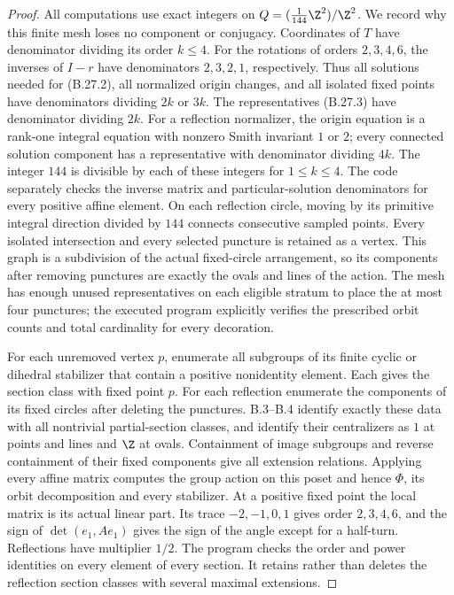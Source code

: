 \begin{proof}
All computations use exact integers on
$Q=(\frac1{144}\Z^2)/\Z^2$.  We record why this finite mesh loses no
component or conjugacy.  Coordinates of $T$ have denominator dividing
its order $k\le4$.  For the rotations of orders $2,3,4,6$, the inverses
of $I-r$ have denominators $2,3,2,1$, respectively.  Thus all solutions
needed for (B.27.2), all normalized origin changes, and all isolated
fixed points have denominators dividing $2k$ or $3k$.
The representatives (B.27.3) have denominator dividing $2k$.
For a reflection normalizer, the origin equation is a rank-one
integral equation with nonzero Smith invariant $1$ or $2$; every
connected solution component has a representative with denominator
dividing $4k$.  The integer $144$ is divisible by each of these
integers for $1\le k\le4$.  The code separately checks the inverse
matrix and particular-solution denominators for every positive affine
element.  On each reflection circle, moving by its primitive integral
direction divided by $144$ connects consecutive sampled points.
Every isolated intersection and every selected puncture is retained
as a vertex.  This graph is a subdivision of the actual fixed-circle
arrangement, so its components after removing punctures are exactly
the ovals and lines of the action.  The mesh has enough unused
representatives on each eligible stratum to place the at most four
punctures; the executed program explicitly verifies the prescribed
orbit counts and total cardinality for every decoration.

For each unremoved vertex $p$, enumerate all subgroups of its finite
cyclic or dihedral stabilizer that contain a positive nonidentity
element.  Each gives the section class with fixed point $p$.
For each reflection enumerate the components of its fixed circles
after deleting the punctures.  B.3--B.4 identify exactly these data
with all nontrivial partial-section classes, and identify their
centralizers as $1$ at points and lines and $\Z$ at ovals.
Containment of image subgroups and reverse containment of their fixed
components give all extension relations.  Applying every affine
matrix computes the group action on this poset and hence $\Phi$,
its orbit decomposition and every stabilizer.  At a positive fixed
point the local matrix is its actual linear part.  Its trace
$-2,-1,0,1$ gives order $2,3,4,6$, and the sign of
$\det(e_1,Ae_1)$ gives the sign of the angle except for a half-turn.
Reflections have multiplier $1/2$.  The program checks the order
and power identities on every element of every section.  It retains
rather than deletes the reflection section classes with several
maximal extensions.


\end{proof}
